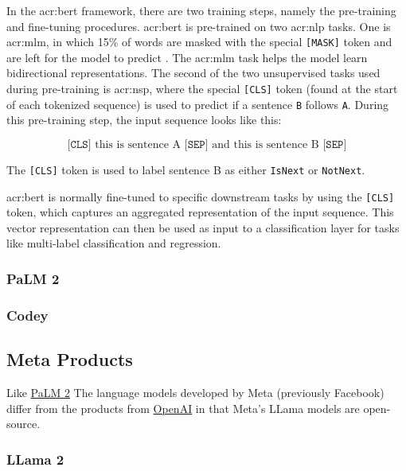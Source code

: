 In the \acrshort{acr:bert} framework, there are two training steps, namely the pre-training and fine-tuning procedures. \acrshort{acr:bert} is pre-trained on two \acrshort{acr:nlp} tasks. One is \gls{acr:mlm}, in which 15\% of words are masked with the special \texttt{[MASK]} token and are left for the model to predict \citep[4]{devlinBERTPretrainingDeep2019}. The \gls{acr:mlm} task helps the model learn bidirectional representations. The second of the two unsupervised tasks used during pre-training is \gls{acr:nsp}, where the special \texttt{[CLS]} token (found at the start of each tokenized sequence) is used to predict if a sentence \texttt{B} follows \texttt{A}. During this pre-training step, the input sequence looks like this:

$$
    \texttt{[CLS]} \text{ this is sentence A } \texttt{[SEP]} \text{ and this is sentence B } \texttt{[SEP]}
$$

The \texttt{[CLS]} token is used to label sentence B as either \texttt{IsNext} or \texttt{NotNext}.

\acrshort{acr:bert} is normally fine-tuned to specific downstream tasks by using the \texttt{[CLS]} token, which captures an aggregated representation of the input sequence. This vector representation can then be used as input to a classification layer for tasks like multi-label classification and regression.

\subsubsection{PaLM 2}\label{subsubsec:palm2}

\subsubsection{Codey}

\subsection{Meta Products}

Like \hyperref[subsubsec:palm2]{PaLM 2} The language models developed by Meta (previously Facebook) differ from the products from \hyperref[subsec:openai-llms]{OpenAI} in that Meta's LLama models are open-source.

\subsubsection{LLama 2}

